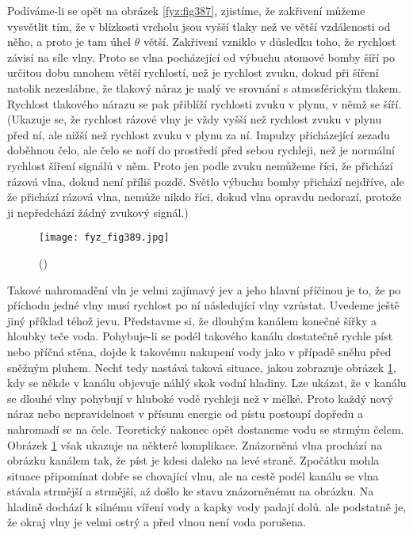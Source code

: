   Podíváme-li se opět na obrázek \ref{fyz:fig387}, zjistíme, že zakřivení můžeme vysvětlit tím, že 
  v blízkosti vrcholu jsou vyšší tlaky než ve větší vzdálenosti od něho, a proto je tam úhel 
  \(\theta\) větší. Zakřivení vzniklo v důsledku toho, že rychlost závisí na síle vlny. Proto se 
  vlna pocházející od výbuchu atomové bomby šíří po určitou dobu mnohem větší rychlostí, než je 
  rychlost zvuku, dokud při šíření natolik nezeslábne, že tlakový náraz je malý ve srovnání s 
  atmosférickým tlakem. Rychlost tlakového nárazu se pak přiblíží rychlosti zvuku v plynu, v němž 
  se šíří. (Ukazuje se, že rychlost rázové vlny je vždy vyšší než rychlost zvuku v plynu před ní, 
  ale nižší než rychlost zvuku v plynu za ní. Impulzy přicházející zezadu doběhnou čelo, ale čelo 
  se noří do prostředí před sebou rychleji, než je normální rychlost šíření signálů v něm. Proto 
  jen podle zvuku nemůžeme říci, že přichází rázová vlna, dokud není příliš pozdě. Světlo výbuchu 
  bomby přichází nejdříve, ale že přichází rázová vlna, nemůže nikdo říci, dokud vlna opravdu 
  nedorazí, protože ji nepředchází žádný zvukový signál.)
  
  \begin{figure}[ht!] %
    \centering
    \texttt{[image: fyz\_fig389.jpg]}
    \caption{
             (\cite[s.~689]{Feynman01})}
    \label{fyz:fig389}
  \end{figure}
  
  Takové nahromadění vln je velmi zajímavý jev a jeho hlavní příčinou je to, že po příchodu jedné 
  vlny musí rychlost po ní následující vlny vzrůstat. Uvedeme ještě jiný příklad téhož jevu. 
  Představme si, že dlouhým kanálem konečné šířky a hloubky teče voda. Pohybuje-li se podél 
  takového kanálu dostatečně rychle píst nebo příčná stěna, dojde k takovému nakupení vody jako v 
  případě sněhu před sněžným pluhem. Nechť tedy nastává taková situace, jakou zobrazuje obrázek 
  \ref{fyz:fig389}, kdy se někde v kanálu objevuje náhlý skok vodní hladiny. Lze ukázat, že v 
  kanálu se dlouhé vlny pohybují v hluboké vodě rychleji než v mělké. Proto každý nový náraz nebo 
  nepravidelnost v přísunu energie od pístu postoupí dopředu a nahromadí se na čele. Teoretický 
  nakonec opět dostaneme vodu se strmým čelem. Obrázek \ref{fyz:fig389} však ukazuje na některé 
  komplikace. Znázorněná vlna prochází na obrázku kanálem tak, že píst je kdesi daleko na levé 
  straně. Zpočátku mohla situace připomínat dobře se chovající vlnu, ale na cestě podél kanálu se 
  vlna stávala strmější a strmější, až došlo ke stavu znázorněnému na obrázku. Na hladině dochází k 
  silnému víření vody a kapky vody padají dolů. ale podstatně je, že okraj vlny je velmi ostrý a 
  před vlnou není voda porušena.  
  
